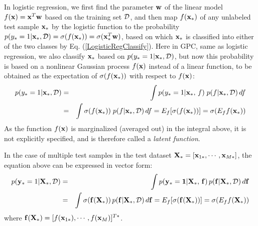 \documentclass{article}
\begin{document}
In logistic regression, we first find the parameter ${\bf w}$ of the
linear model $f({\bf x})={\bf x}^T{\bf w}$ based on the training set
${\cal D}$, and then map $f({\bf x}_*)$ of any unlabeled test sample
${\bf x}_*$ by the logistic function to the probability
$p(y_*=1|{\bf x}_*,{\cal D})=\sigma(f({\bf x}_*))=\sigma({\bf x}^T_*{\bf w})$,
based on which ${\bf x}_*$ is classified into either of the two 
classes by Eq. (\ref{LogisticRegClassify}). Here in GPC, same 
as logistic regression, we also classify ${\bf x}_*$ based on 
$p(y_*=1|{\bf x}_*,{\cal D})$, but now this probability is based 
on a nonlinear Gaussian process $f({\bf x})$ instead of a linear
function, to be obtained as the expectation of $\sigma(f({\bf x}_*))$
with respect to $f({\bf x})$: 
\begin{eqnarray}
  p(y_*=1|{\bf x}_*,{\cal D})
  &=&\int p(y_*=1|{\bf x}_*,\,f)\;p(f|{{\bf x}_*,\cal D})\,d f
  \nonumber\\
  &=&\int\sigma(f({\bf x}_*))\;p(f|{\bf x}_*,{\cal D})\,d f
  =E_f[\sigma(f({\bf x}_*))]=\sigma(E_f f({\bf x}_*))
\end{eqnarray}
As the function $f({\bf x})$ is marginalized (averaged out) in the 
integral above, it is not explicitly specified, and is therefore 
called a {\em latent function}. 

In the case of multiple test samples in the test dataset
${\bf X}_*=[{\bf x}_{1*},\cdots,{\bf x}_{M*}]$, the equation above
can be expressed in vector form:
\begin{eqnarray}
  p({\bf y}_*=1|{\bf X}_*,{\cal D})  &=&
  \int p({\bf y}_*={\bf 1}|{\bf X}_*,\,{\bf f})\,
  p({\bf f}|{\bf X}_*,{\cal D})\,d {\bf f}
  \nonumber\\
  &=&\int\sigma({\bf f}({\bf X}_*))\, p({\bf f}|{\bf X}_*,{\cal D})\,d {\bf f}
  =E_f[\sigma({\bf f}({\bf X}_*))]
  =\sigma(E_f f({\bf X}_*))
  \label{GPClassification}
\end{eqnarray}
where ${\bf f}({\bf X}_*)=[f({\bf x}_{1*}),\cdots,f({\bf x}_M)]^{T*}$.

\end{document}
